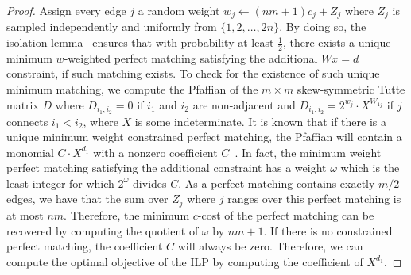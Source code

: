 \documentclass[a4paper,UKenglish,cleveref,thm-restate]{lipics-v2021}
\begin{document}
\begin{proof}
    Assign every edge $j$ a random weight $w_j\gets(nm+1)c_j+Z_j$ where $Z_j$ is sampled independently and uniformly from $\{1,2,\dots,2n\}$. By doing so, the isolation lemma~\cite{DBLP:journals/combinatorica/MulmuleyVV87} ensures that with probability at least $\tfrac12$, there exists a unique minimum $w$-weighted perfect matching satisfying the additional $Wx=d$ constraint, if such matching exists. To check for the existence of such unique minimum matching, we compute the Pfaffian of the $m\times m$ skew-symmetric Tutte matrix $D$ where $D_{i_1,i_2}=0$ if $i_1$ and $i_2$ are non-adjacent and $D_{i_1,i_2}=2^{w_j}\cdot X^{W_{1j}}$ if $j$ connects $i_1<i_2$, where $X$ is some indeterminate. It is known that if there is a unique minimum weight constrained perfect matching, the Pfaffian will contain a monomial $C\cdot X^{d_1}$ with a nonzero coefficient $C$~\cite{DBLP:journals/combinatorica/MulmuleyVV87}. In fact, the minimum weight perfect matching satisfying the additional constraint has a weight $\omega$ which is the least integer for which $2^\omega$ divides $C$. As a perfect matching contains exactly $m/2$ edges, we have that the sum over $Z_j$ where $j$ ranges over this perfect matching is at most $nm$. Therefore, the minimum $c$-cost of the perfect matching can be recovered by computing the quotient of $\omega$ by $nm+1$. If there is no constrained perfect matching, the coefficient $C$ will always be zero. Therefore, we can compute the optimal objective of the ILP by computing the coefficient of $X^{d_1}$.
    

\end{proof}
\end{document}
